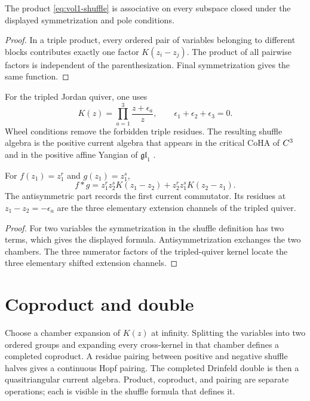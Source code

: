 \begin{theorem}
The product \eqref{eq:vol1-shuffle} is associative on every subspace closed under the displayed symmetrization and pole conditions.
\end{theorem}
\begin{proof}
In a triple product, every ordered pair of variables belonging to different blocks contributes exactly one factor $K(z_i-z_j)$.  The product of all pairwise factors is independent of the parenthesization.  Final symmetrization gives the same function.
\end{proof}

For the tripled Jordan quiver, one uses
\[
 K(z)=\prod_{a=1}^3\frac{z+\epsilon_a}{z},
 \qquad \epsilon_1+\epsilon_2+\epsilon_3=0.
\]
Wheel conditions remove the forbidden triple residues.  The resulting shuffle algebra is the positive current algebra that appears in the critical CoHA of $C^3$ and in the positive affine Yangian of $\mathfrak{gl}_1$ \cite{SVYangians,Tsymbaliuk}.

\begin{calculation}
For $f(z_1)=z_1^r$ and $g(z_1)=z_1^s$,
\[
 f*g
 =z_1^rz_2^sK(z_1-z_2)+z_2^rz_1^sK(z_2-z_1).
\]
The antisymmetric part records the first current commutator.  Its residues at $z_1-z_2=-\epsilon_a$ are the three elementary extension channels of the tripled quiver.
\end{calculation}
\begin{proof}
For two variables the symmetrization in the shuffle definition has two terms, which gives the displayed formula.  Antisymmetrization exchanges the two chambers.  The three numerator factors of the tripled-quiver kernel locate the three elementary shifted extension channels.
\end{proof}

\section{Coproduct and double}
Choose a chamber expansion of $K(z)$ at infinity.  Splitting the variables into two ordered groups and expanding every cross-kernel in that chamber defines a completed coproduct.  A residue pairing between positive and negative shuffle halves gives a continuous Hopf pairing.  The completed Drinfeld double is then a quasitriangular current algebra.  Product, coproduct, and pairing are separate operations; each is visible in the shuffle formula that defines it.

